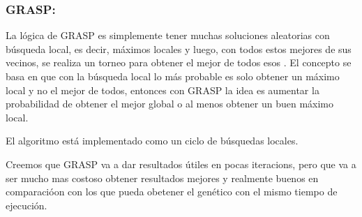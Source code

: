 \subsubsection{GRASP:}


La lógica de GRASP es simplemente tener muchas soluciones aleatorias con
búsqueda local, es decir, máximos locales y luego, con todos estos mejores de
sus vecinos, se realiza un torneo para obtener el mejor de todos esos . El
concepto se basa en que con la búsqueda local lo más probable es solo obtener un
máximo local y no el mejor de todos, entonces con GRASP la idea es aumentar la
probabilidad de obtener el mejor global o al menos obtener un buen máximo local.

El algoritmo está implementado como un ciclo de búsquedas locales.

Creemos que GRASP va a dar resultados útiles en pocas iteracions, pero que va a
ser mucho mas costoso obtener resultados mejores y realmente buenos en
comparacióon con los que pueda obetener el genético con el mismo tiempo de
ejecución.


